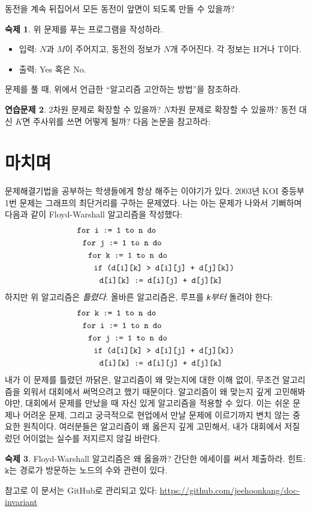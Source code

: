 \documentclass{oblivoir}
\theoremstyle{definition}
\newtheorem{exercise}{연습문제}
\newtheorem{homework}[exercise]{숙제}
\begin{document}
동전을 계속 뒤집어서 모든 동전이 앞면이 되도록 만들 수 있을까?

\begin{homework}
  위 문제를 푸는 프로그램을 작성하라.
  \begin{itemize}
  \item 입력: $N$과 $M$이 주어지고, 동전의 정보가 $N$개 주어진다. 각
    정보는 H거나 T이다.
  \item 출력: Yes 혹은 No.
  \end{itemize}
\end{homework}

문제를 풀 때, 위에서 언급한 ``알고리즘 고안하는 방법''을 참조하라.

\begin{exercise}
  2차원 문제로 확장할 수 있을까? $N$차원 문제로 확장할 수 있을까?  동전
  대신 $K$면 주사위를 쓰면 어떻게 될까?  다음 논문을 참고하라:
  \cite{DBLP:journals/combinatorics/KangKP12}
\end{exercise}

\section{마치며}
문제해결기법을 공부하는 학생들에게 항상 해주는 이야기가 있다.  2003년
KOI 중등부 1번 문제는 그래프의 최단거리를 구하는 문제였다.  나는 아는
문제가 나와서 기뻐하며 다음과 같이 Floyd-Warshall 알고리즘을 작성했다:
\begin{align*}
& \texttt{for \texttt{i} := 1 to n do} \\
& \ \ \texttt{for \texttt{j} := 1 to n do} \\
& \ \ \ \ \texttt{for \texttt{k} := 1 to n do} \\
& \ \ \ \ \ \ \texttt{if (d[i][k] > d[i][j] + d[j][k])} \\
& \ \ \ \ \ \ \ \ \texttt{d[i][k] := d[i][j] + d[j][k]}
\end{align*}
하지만 위 알고리즘은 \emph{틀렸다}.  올바른 알고리즘은, 루프를
\emph{\texttt{k}부터} 돌려야 한다:
\begin{align*}
& \texttt{for \texttt{k} := 1 to n do} \\
& \ \ \texttt{for \texttt{i} := 1 to n do} \\
& \ \ \ \ \texttt{for \texttt{j} := 1 to n do} \\
& \ \ \ \ \ \ \texttt{if (d[i][k] > d[i][j] + d[j][k])} \\
& \ \ \ \ \ \ \ \ \texttt{d[i][k] := d[i][j] + d[j][k]}
\end{align*}
내가 이 문제를 틀렸던 까닭은, 알고리즘이 왜 맞는지에 대한 이해 없이,
무조건 알고리즘을 외워서 대회에서 써먹으려고 했기 때문이다.  알고리즘이
왜 맞는지 깊게 고민해봐야만, 대회에서 문제를 만났을 때 자신 있게
알고리즘을 적용할 수 있다.  이는 쉬운 문제나 어려운 문제, 그리고
궁극적으로 현업에서 만날 문제에 이르기까지 변치 않는 중요한 원칙이다.
여러분들은 알고리즘이 왜 옳은지 깊게 고민해서, 내가 대회에서 저질렀던
어이없는 실수를 저지르지 않길 바란다.

\begin{homework}
  Floyd-Warshall 알고리즘은 왜 옳을까?  간단한 에세이를 써서 제출하라.
  힌트: $\texttt{k}$는 경로가 방문하는 노드의 수와 관련이 있다.
\end{homework}

참고로 이 문서는 GitHub로 관리되고 있다:
\url{https://github.com/jeehoonkang/doc-invariant}



\end{document}
